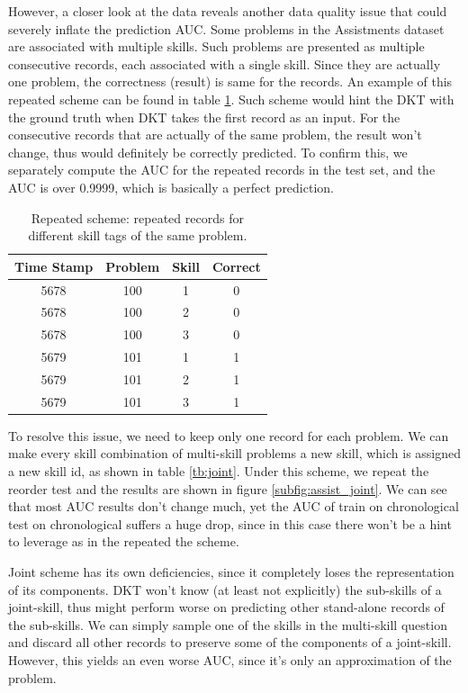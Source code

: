 However, a closer look at the data reveals another data quality issue that could severely inflate the prediction AUC.
Some problems in the Assistments dataset are associated with multiple skills. Such problems are presented as multiple consecutive records, each associated with a single skill. Since they are actually one problem, the correctness (result) is same for the records. An example of this repeated scheme can be found in table \ref{tb:repeated}. Such scheme would hint the DKT with the ground truth when DKT takes the first record as an input. For the consecutive records that are actually of the same problem, the result won't change, thus would definitely be correctly predicted. To confirm this, we separately compute the AUC for the repeated records in the test set, and the AUC is over 0.9999, which is basically a perfect prediction.

\begin{table}[]
\centering
\begin{tabular}{|c|c|c|c|}
\hline
Time Stamp & Problem & Skill & Correct \\ \hline
5678       & 100     & 1     & 0       \\ \hline
5678       & 100     & 2     & 0       \\ \hline
5678       & 100     & 3     & 0       \\ \hline
5679       & 101     & 1     & 1       \\ \hline
5679       & 101     & 2     & 1       \\ \hline
5679       & 101     & 3     & 1       \\ \hline
\end{tabular}
\caption{Repeated scheme: repeated records for different skill tags of the same problem.}
\label{tb:repeated}
\end{table}

To resolve this issue, we need to keep only one record for each problem. We can make every skill combination of multi-skill problems a new skill, which is assigned a new skill id, as shown in table \ref{tb:joint}. Under this scheme, we repeat the reorder test and the results are shown in figure \ref{subfig:assist_joint}. We can see that most AUC results don't change much, yet the AUC of train on chronological test on chronological suffers a huge drop, since in this case there won't be a hint to leverage as in the repeated the scheme.

Joint scheme has its own deficiencies, since it completely loses the representation of its components. DKT won't know (at least not explicitly) the sub-skills of a joint-skill, thus might perform worse on predicting other stand-alone records of the sub-skills. We can simply sample one of the skills in the multi-skill question and discard all other records to preserve some of the components of a joint-skill. However, this yields an even worse AUC, since it's only an approximation of the problem.  

